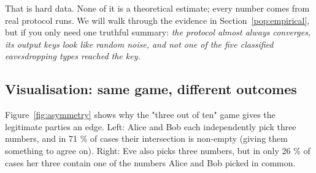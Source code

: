 \documentclass[11pt,a4paper]{article}
\begin{document}
That is hard data. None of it is a theoretical estimate; every number comes from real protocol runs. We will walk through the evidence in Section~\ref{pop:empirical}, but if you only need one truthful summary: \emph{the protocol almost always converges, its output keys look like random noise, and not one of the five classified eavesdropping types reached the key.}

\subsection{Visualisation: same game, different outcomes}\label{pop:fig-asymmetry}

Figure~\ref{fig:asymmetry} shows why the "three out of ten" game gives the legitimate parties an edge. Left: Alice and Bob each independently pick three numbers, and in 71 \% of cases their intersection is non-empty (giving them something to agree on). Right: Eve also picks three numbers, but in only 26 \% of cases her three contain one of the numbers Alice and Bob picked in common.
\end{document}

